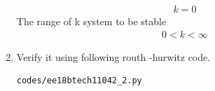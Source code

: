 \begin{enumerate}[label=\thesection.\arabic*.,ref=\thesection.\theenumi]
\begin{align}
k = 0
\label{eq:ee18btech11042_8}
\end{align}
The range of k system to be stable
\begin{align}
0<k<\infty
\label{eq:ee18btech11042_9}
\end{align}
\item Verify it using following routh -hurwitz code.
\begin{lstlisting}
codes/ee18btech11042_2.py
\end{lstlisting}
\end{enumerate}
